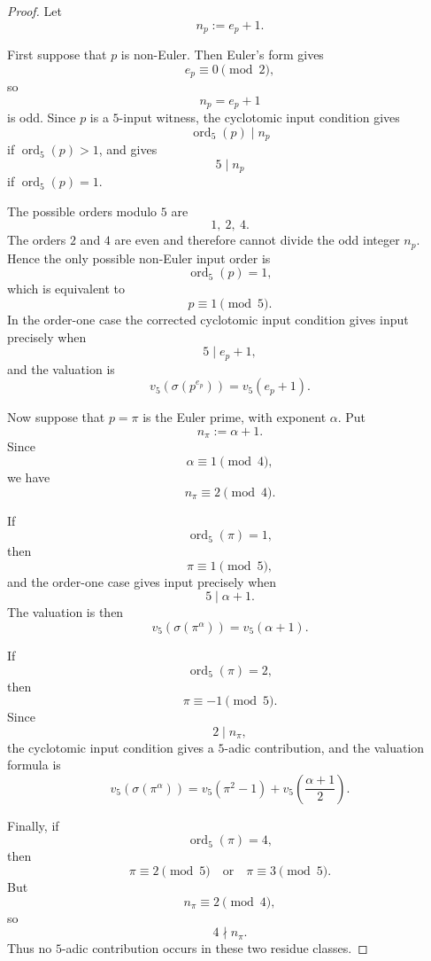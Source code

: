 \documentclass[10pt,a4paper]{amsart}
\DeclareMathOperator{\ord}{ord}
\begin{document}
\begin{proof}
Let
\[
  n_p:=e_p+1.
\]

First suppose that $p$ is non-Euler.  Then Euler's form gives
\[
  e_p\equiv0\pmod2,
\]
so
\[
  n_p=e_p+1
\]
is odd.  Since $p$ is a $5$-input witness, the cyclotomic input condition gives
\[
  \ord_5(p)\mid n_p
\]
if $\ord_5(p)>1$, and gives
\[
  5\mid n_p
\]
if $\ord_5(p)=1$.

The possible orders modulo $5$ are
\[
  1,\ 2,\ 4.
\]
The orders $2$ and $4$ are even and therefore cannot divide the odd integer
$n_p$.  Hence the only possible non-Euler input order is
\[
  \ord_5(p)=1,
\]
which is equivalent to
\[
  p\equiv1\pmod5.
\]
In the order-one case the corrected cyclotomic input condition gives input
precisely when
\[
  5\mid e_p+1,
\]
and the valuation is
\[
  v_5(\sigma(p^{e_p}))=v_5(e_p+1).
\]

Now suppose that $p=\pi$ is the Euler prime, with exponent $\alpha$.  Put
\[
  n_\pi:=\alpha+1.
\]
Since
\[
  \alpha\equiv1\pmod4,
\]
we have
\[
  n_\pi\equiv2\pmod4.
\]

If
\[
  \ord_5(\pi)=1,
\]
then
\[
  \pi\equiv1\pmod5,
\]
and the order-one case gives input precisely when
\[
  5\mid \alpha+1.
\]
The valuation is then
\[
  v_5(\sigma(\pi^\alpha))=v_5(\alpha+1).
\]

If
\[
  \ord_5(\pi)=2,
\]
then
\[
  \pi\equiv-1\pmod5.
\]
Since
\[
  2\mid n_\pi,
\]
the cyclotomic input condition gives a $5$-adic contribution, and the valuation
formula is
\[
  v_5(\sigma(\pi^\alpha))
  =
  v_5(\pi^2-1)
  +
  v_5\!\left(\frac{\alpha+1}{2}\right).
\]

Finally, if
\[
  \ord_5(\pi)=4,
\]
then
\[
  \pi\equiv2\pmod5
  \quad\text{or}\quad
  \pi\equiv3\pmod5.
\]
But
\[
  n_\pi\equiv2\pmod4,
\]
so
\[
  4\nmid n_\pi.
\]
Thus no $5$-adic contribution occurs in these two residue classes.
\end{proof}
\end{document}
